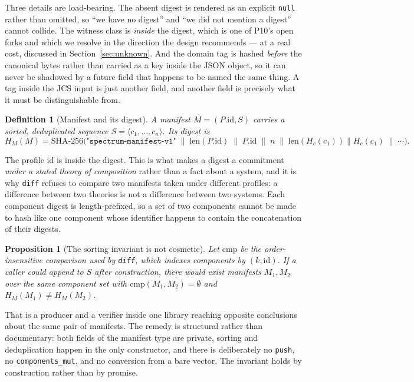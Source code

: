 \documentclass[11pt]{article}
\newtheorem{definition}{Definition}
\newtheorem{proposition}{Proposition}
\begin{document}
Three details are load-bearing. The absent digest is rendered as an explicit
\texttt{null} rather than omitted, so ``we have no digest'' and ``we did not
mention a digest'' cannot collide. The witness class is \emph{inside} the
digest, which is one of P10's open forks and which we resolve in the direction
the design recommends --- at a real cost, discussed in
Section~\ref{sec:unknown}. And the domain tag is hashed \emph{before} the
canonical bytes rather than carried as a key inside the JSON object, so it can
never be shadowed by a future field that happens to be named the same thing. A
tag inside the JCS input is just another field, and another field is precisely
what it must be distinguishable from.

\begin{definition}[Manifest and its digest]
A manifest $M = (P.\mathrm{id}, S)$ carries a sorted, deduplicated sequence
$S = \langle c_1, \ldots, c_n\rangle$. Its digest is
\[
  H_M(M) = \mathrm{SHA\text{-}256}\big(\texttt{"spectrum-manifest-v1"} \;\|\;
  \mathrm{len}(P.\mathrm{id}) \;\|\; P.\mathrm{id} \;\|\; n \;\|\;
  \mathrm{len}(H_c(c_1)) \| H_c(c_1) \;\|\; \cdots \big).
\]
\end{definition}

The profile id is inside the digest. This is what makes a digest a commitment
\emph{under a stated theory of composition} rather than a fact about a system,
and it is why \texttt{diff} refuses to compare two manifests taken under
different profiles: a difference between two theories is not a difference
between two systems. Each component digest is length-prefixed, so a set of two
components cannot be made to hash like one component whose identifier happens
to contain the concatenation of their digests.

\begin{proposition}[The sorting invariant is not cosmetic]
\label{prop:sort}
Let $\mathrm{cmp}$ be the order-insensitive comparison used by \texttt{diff},
which indexes components by $(k, \mathrm{id})$. If a caller could append to
$S$ after construction, there would exist manifests $M_1, M_2$ over the same
component set with $\mathrm{cmp}(M_1, M_2) = \emptyset$ and $H_M(M_1) \neq
H_M(M_2)$.
\end{proposition}

\noindent
That is a producer and a verifier inside one library reaching opposite
conclusions about the same pair of manifests. The remedy is structural rather
than documentary: both fields of the manifest type are private, sorting and
deduplication happen in the only constructor, and there is deliberately no
\texttt{push}, no \texttt{components\_mut}, and no conversion from a bare
vector. The invariant holds by construction rather than by promise.
\end{document}

